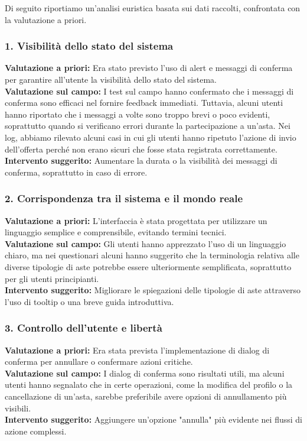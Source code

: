 Di seguito riportiamo un'analisi euristica basata sui dati raccolti, confrontata con la valutazione a priori.

\subsubsection*{1. Visibilità dello stato del sistema}
\textbf{Valutazione a priori:} Era stato previsto l’uso di alert e messaggi di conferma per garantire all'utente la visibilità dello stato del sistema.\\
\textbf{Valutazione sul campo:} I test sul campo hanno confermato che i messaggi di conferma sono efficaci nel fornire feedback immediati. Tuttavia, alcuni utenti hanno riportato che i messaggi a volte sono troppo brevi o poco evidenti, soprattutto quando si verificano errori durante la partecipazione a un'asta. Nei log, abbiamo rilevato alcuni casi in cui gli utenti hanno ripetuto l'azione di invio dell'offerta perché non erano sicuri che fosse stata registrata correttamente.\\
\textbf{Intervento suggerito:} Aumentare la durata o la visibilità dei messaggi di conferma, soprattutto in caso di errore.

\subsubsection*{2. Corrispondenza tra il sistema e il mondo reale}
\textbf{Valutazione a priori:} L'interfaccia è stata progettata per utilizzare un linguaggio semplice e comprensibile, evitando termini tecnici.\\
\textbf{Valutazione sul campo:} Gli utenti hanno apprezzato l'uso di un linguaggio chiaro, ma nei questionari alcuni hanno suggerito che la terminologia relativa alle diverse tipologie di aste potrebbe essere ulteriormente semplificata, soprattutto per gli utenti principianti.\\
\textbf{Intervento suggerito:} Migliorare le spiegazioni delle tipologie di aste attraverso l'uso di tooltip o una breve guida introduttiva.

\subsubsection*{3. Controllo dell'utente e libertà}
\textbf{Valutazione a priori:} Era stata prevista l'implementazione di dialog di conferma per annullare o confermare azioni critiche.\\
\textbf{Valutazione sul campo:} I dialog di conferma sono risultati utili, ma alcuni utenti hanno segnalato che in certe operazioni, come la modifica del profilo o la cancellazione di un'asta, sarebbe preferibile avere opzioni di annullamento più visibili.\\
\textbf{Intervento suggerito:} Aggiungere un'opzione "annulla" più evidente nei flussi di azione complessi.

